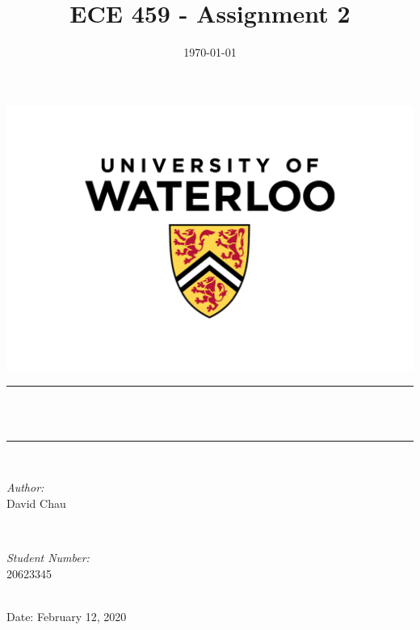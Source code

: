 \documentclass[12pt,reqno]{article}
\title{ECE 459 - Assignment 2} %
\author{}
\date{\today} %
\makeatletter
\let\thetitle\@title
\makeatother
\begin{document}
\newcommand{\units}[1]{$\hspace{0.25em}\mathrm{[#1]}$}


\begin{titlepage}
	\centering
    \vspace*{-1 cm}
    \includegraphics[scale = 0.5]{titlepage/UW.jpg}\\	%
	\rule{\linewidth}{0.2 mm} \\[0.4 cm]
	{ \huge \bfseries \thetitle}\\
	\rule{\linewidth}{0.2 mm} \\[1.5 cm]
	
	\begin{minipage}[t]{0.4\textwidth}
		\begin{flushleft} \large
			\emph{Author:}\\
            David Chau \\
			\end{flushleft}
			\end{minipage}~
			\begin{minipage}[t]{0.4\textwidth}
			\begin{flushright} \large
			\emph{Student Number:} \\
            20623345\\
		\end{flushright}
	\end{minipage}\\[2 cm]
	Date: 
	{\large February 12, 2020}\\[2 cm]
	\vfill
\end{titlepage}
\end{document}
